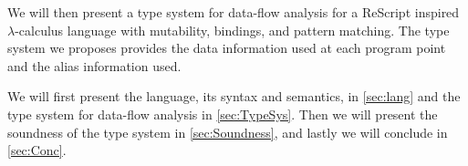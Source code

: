 \documentclass[../../master.tex]{subfiles}
\begin{document}
We will then present a type system for data-flow analysis for a ReScript inspired $\lambda$-calculus language with mutability, bindings, and pattern matching.
The type system we proposes provides the data information used at each program point and the alias information used.
\bigskip

We will first present the language, its syntax and semantics, in \cref{sec:lang} and the type system for data-flow analysis in \cref{sec:TypeSys}.
Then we will present the soundness of the type system in \cref{sec:Soundness}, and lastly we will conclude in \cref{sec:Conc}.
\end{document}
